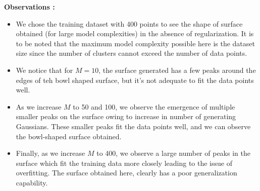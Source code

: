 \documentclass{article}
\begin{document}
\textbf{Observations : \newline}
\begin{itemize}
\item We chose the training dataset with 400 points to see the shape of surface obtained (for large model complexities) in the absence of regularization. It is to be noted that the maximum model complexity possible here is the dataset size since the number of clusters cannot exceed the number of data points.
\item We notice that for $M=10$, the surface generated has a few peaks around the edges of teh bowl shaped surface, but it's not adequate to fit the data points well.

\item As we increase $M$ to 50 and 100, we observe the emergence of multiple smaller peaks on the surface owing to increase in number of generating Gaussians. These smaller peaks fit the data points well, and we can observe the bowl-shaped surface obtained.
\item Finally, as we increase $M$ to 400, we observe a large number of peaks in the surface which fit the training data more closely leading to the issue of overfitting. The surface obtained here, clearly has a poor generalization capability.
\end{itemize}
\end{document}
